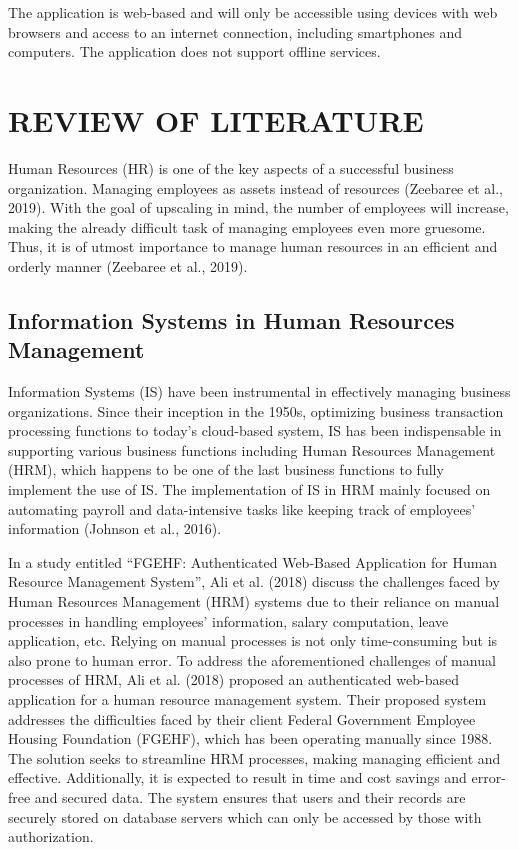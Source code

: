\documentclass{icsthesis}
\begin{document}
\begin{mainmatter}
The application is web-based and will only be accessible using devices with web browsers and access to an internet connection, including smartphones and computers. The application does not support offline services.

		
		\section{REVIEW OF LITERATURE}
			Human Resources (HR) is one of the key aspects of a successful business organization. Managing employees as assets instead of resources (Zeebaree et al., 2019). With the goal of upscaling in mind, the number of employees will increase, making the already difficult task of managing employees even more gruesome. Thus, it is of utmost importance to manage human resources in an efficient and orderly manner (Zeebaree et al., 2019).   


\subsection{\textbf{Information Systems in Human Resources Management}}

Information Systems (IS) have been instrumental in effectively managing business organizations. Since their inception in the 1950s, optimizing business transaction processing functions to today’s cloud-based system, IS has been indispensable in supporting various business functions including Human Resources Management (HRM), which happens to be one of the last business functions to fully implement the use of IS. The implementation of IS in HRM mainly focused on automating payroll and data-intensive tasks like keeping track of employees’ information (Johnson et al., 2016).

In a study entitled “FGEHF: Authenticated Web-Based Application for Human Resource Management System”, Ali et al. (2018) discuss the challenges faced by Human Resources Management (HRM) systems due to their reliance on manual processes in handling employees’ information, salary computation, leave application, etc. Relying on manual processes is not only time-consuming but is also prone to human error. To address the aforementioned challenges of manual processes of HRM, Ali et al. (2018) proposed an authenticated web-based application for a human resource management system. Their proposed system addresses the difficulties faced by their client Federal Government Employee Housing Foundation (FGEHF), which has been operating manually since 1988. The solution seeks to streamline HRM processes, making managing efficient and effective. Additionally, it is expected to result in time and cost savings and error-free and secured data. The system ensures that users and their records are securely stored on database servers which can only be accessed by those with authorization. 



\end{mainmatter}
\end{document}
